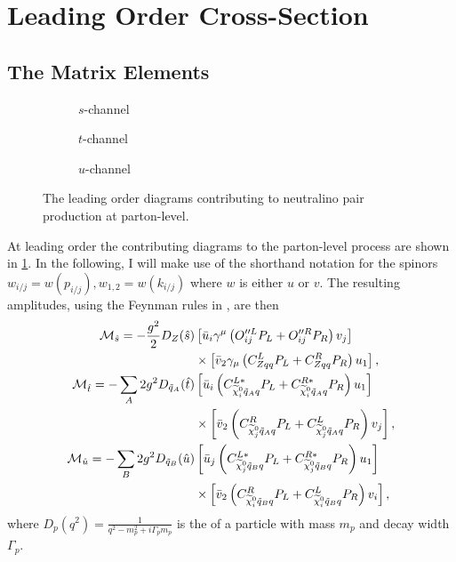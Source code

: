 \documentclass[../main.tex]{subfiles}
\begin{document}
\section{Leading Order Cross-Section}

\subsection{The Matrix Elements}
\begin{figure} [ht!]
	\centering
	\begin{subfigure}{0.3\linewidth}
		\centering
		\caption{\(s\)-channel}
	\end{subfigure}
	\begin{subfigure}{0.3\linewidth}
		\centering
		\caption{\(t\)-channel}
	\end{subfigure}
	\begin{subfigure}{0.3\linewidth}
		\centering
		\caption{\(u\)-channel}
	\end{subfigure}
	\caption{The leading order diagrams contributing to neutralino pair production at parton-level.}
	\label{fig:tree_level_diagrams}
\end{figure}

At leading order the contributing diagrams to the parton-level process are
shown in \cref{fig:tree_level_diagrams}. In the following, I will make use of
the shorthand notation for the spinors \(w_{i/j} = w(p_{i/j}), w_{1,2} =
w(k_{i/j})\) where \(w\) is either \(u\) or \(v\). The resulting amplitudes,
using the Feynman rules in , are then
\begin{subequations}
	\begin{align}
		\nonumber
		\M_{\hat{s}} = -\frac{g^2}{2} D_Z(\hat{s})           & \bclosed{ \bar{u}_i\gamma^\mu\pclosed{O^{\prime\prime L}_{ij}P_L + O^{\prime\prime R}_{ij}P_R} v_j }           \\
		                                                     & \times \bclosed{ \bar{v}_2 \gamma_\mu \pclosed{C^L_{Zqq}P_L + C^R_{Zqq}P_R} u_1 },                             \\
		\nonumber
		\M_{\hat{t}} = -\sum_A 2g^2 D_{\tilde{q}_A}(\hat{t}) & \bclosed{ \bar{u}_i \pclosed{C_{\nino[i]\tilde{q}_Aq}^{L\ast}P_L + C_{\nino[i]\tilde{q}_Aq}^{R\ast} P_R} u_1 } \\
		                                                     & \times \bclosed{ \bar{v}_2 \pclosed{C^R_{\nino[j]\tilde{q}_Aq}P_L + C^L_{\nino[j]\tilde{q}_Aq}P_R} v_j },      \\
		\nonumber
		\M_{\hat{u}} = -\sum_B 2g^2 D_{\tilde{q}_B}(\hat{u}) & \bclosed{ \bar{u}_j \pclosed{C_{\nino[j]\tilde{q}_Bq}^{L\ast}P_L + C_{\nino[j]\tilde{q}_Bq}^{R\ast} P_R} u_1 } \\
		                                                     & \times \bclosed{ \bar{v}_2 \pclosed{C^R_{\nino[i]\tilde{q}_Bq}P_L + C^L_{\nino[i]\tilde{q}_Bq}P_R} v_i },
	\end{align}
\end{subequations}
where \(D_p(q^2) = \frac{1}{q^2 - m_p^2 + i\Gamma_p m_p}\) is the  of a particle with mass \(m_p\) and decay width \(\Gamma_p\).
\end{document}
